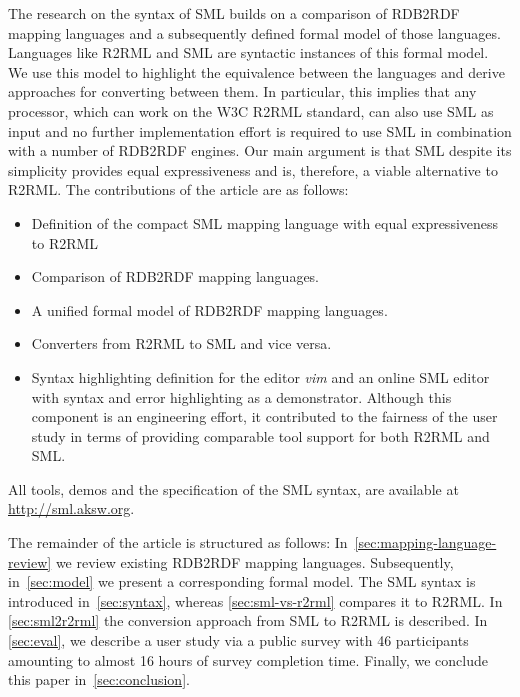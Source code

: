 The research on the syntax of SML builds on a comparison of RDB2RDF mapping languages and a subsequently defined formal model of those languages.
Languages like R2RML and SML are syntactic instances of this formal model.
We use this model to highlight the equivalence between the languages and derive approaches for converting between them.
In particular, this implies that any processor, which can work on the W3C R2RML standard, can also use SML as input and no further implementation effort is required to use SML in combination with a number of RDB2RDF engines.
Our main argument is that SML despite its simplicity provides equal expressiveness and is, therefore, a viable alternative to R2RML.
The contributions of the article are as follows:
\begin{itemize}
 \item Definition of the compact SML mapping language with equal expressiveness to R2RML
 \item Comparison of RDB2RDF mapping languages.
 \item A unified formal model of RDB2RDF mapping languages.
 \item Converters from R2RML to SML and vice versa.
 \item Syntax highlighting definition for the editor \emph{vim} and an online
 SML editor with syntax and error highlighting as a demonstrator.
 Although this component is an engineering effort, it contributed to
 the fairness of the user study in terms of providing comparable tool support
 for both R2RML and SML.
\end{itemize}

All tools, demos and the specification of the SML syntax, are available at \url{http://sml.aksw.org}.

The remainder of the article is structured as follows:
In~\autoref{sec:mapping-language-review} we review existing RDB2RDF mapping
languages. Subsequently, in~\autoref{sec:model} we present a corresponding
formal model. The SML syntax is introduced in~\autoref{sec:syntax},
whereas \autoref{sec:sml-vs-r2rml} compares it to R2RML.
In \autoref{sec:sml2r2rml} the conversion approach from SML to R2RML is described.
In \autoref{sec:eval}, we describe a user study via a public survey with 46 participants amounting to almost 16 hours of survey completion time.
Finally, we conclude this paper in~\autoref{sec:conclusion}.

